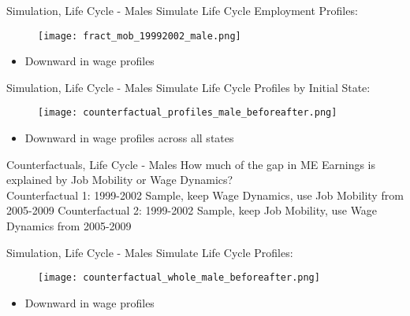 \documentclass{beamer}
\begin{document}
\begin{frame}{Simulation, Life Cycle - Males}\label{EstimationLCMalesII}
	Simulate Life Cycle Employment Profiles:
	\begin{figure}[!t]
		\centering
		\begin{minipage}[b]{1\textwidth}{}
			\centering
			\texttt{[image: fract\_mob\_19992002\_male.png]}
		\end{minipage}
	\end{figure}
	\begin{itemize}
		\setlength{\itemsep}{0.7 cm}
		\item Downward in wage profiles
	\end{itemize}
\end{frame}

\begin{frame}{Simulation, Life Cycle - Males}\label{EstimationLCMalesIII}
	Simulate Life Cycle Profiles by Initial State:
	\begin{figure}[!t]
		\centering
		\begin{minipage}[b]{1\textwidth}{}
			\centering
			\texttt{[image: counterfactual\_profiles\_male\_beforeafter.png]}
		\end{minipage}
	\end{figure}
	\begin{itemize}
		\setlength{\itemsep}{0.7 cm}
		\item Downward in wage profiles across all states
	\end{itemize}
\end{frame}

\begin{frame}{Counterfactuals, Life Cycle - Males}\label{CounterfactualME}
How much of the gap in ME Earnings is explained by Job Mobility or Wage Dynamics?\\
\vfill
Counterfactual 1: 1999-2002 Sample, keep Wage Dynamics, use Job Mobility from 2005-2009
\vfill
Counterfactual 2: 1999-2002 Sample, keep Job Mobility, use Wage Dynamics from 2005-2009
\end{frame}

\begin{frame}{Simulation, Life Cycle - Males}\label{EstimationLCMalesWhole}
	Simulate Life Cycle Profiles:
	\begin{figure}[!t]
		\centering
		\begin{minipage}[b]{1\textwidth}{}
			\centering
			\texttt{[image: counterfactual\_whole\_male\_beforeafter.png]}
		\end{minipage}
	\end{figure}
	\begin{itemize}
		\setlength{\itemsep}{0.7 cm}
		\item Downward in wage profiles
	\end{itemize}
\end{frame}
\end{document}
